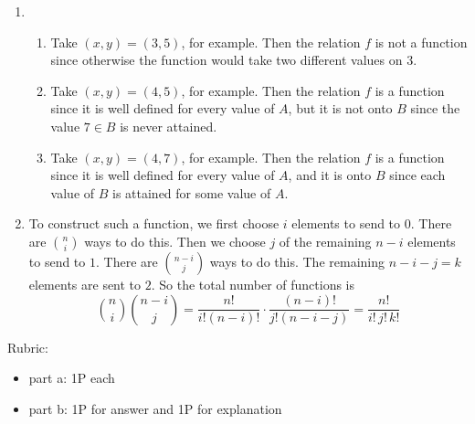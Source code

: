 \documentclass{article}
\theoremstyle{definition}
\begin{document}
\begin{solution}
\begin{enumerate}
	\item 
	\begin{enumerate}
		\item Take \((x, y)  = (3,5)\), for example. Then the relation \(f\) is not a function since  otherwise the function would take two different values on \(3\).
		\item Take \((x, y)  = (4,5)\), for example. Then the relation \(f\) is a function since it is well defined for every value of \(A\),  but it is not onto \(B\) since the value \(7\in B\) is never attained. 
		\item Take \((x, y)  = (4,7)\), for example. Then the relation \(f\) is a function since it is well defined for every value of \(A\),  and it is onto \(B\) since each value of \( B\) is attained for some value of \(A\). 
	\end{enumerate}

	\item      To construct such a function, we first choose \(i\) elements to send to \(0\).
	There are \(\binom{n}{i}\) ways to do this.  Then we choose \(j\) of the remaining
	\(n-i\) elements to send to \(1\).  There are \(\binom{n-i}{j}\) ways to do this.
	The remaining \(n-i-j = k\) elements are sent to \(2\).  So the total number
	of functions is
	\[
	\binom{n}{i} \binom{n-i}{j}
	= \frac{n!}{i!(n-i)!} \cdot \frac{(n-i)!}{j!(n-i-j)}
	= \frac{n!}{i!\,j!\,k!}
	\]

\end{enumerate}
{\color{red} Rubric:
\begin{itemize}
\item part a: 1P each
\item part b: 1P for answer and 1P for explanation
\end{itemize}}


\end{solution}
\end{document}
